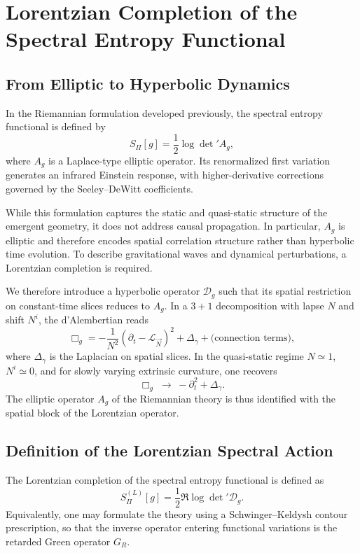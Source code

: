 \section{Lorentzian Completion of the Spectral Entropy Functional}
  \label{sec:lorentzian_completion}

  \subsection{From Elliptic to Hyperbolic Dynamics}
    \label{subsec:from-elliptic-to-hyperbolic-dynamics}

    In the Riemannian formulation developed previously, the spectral entropy
    functional is defined by
    \[
      S_\Pi[g] = \frac12 \log \det{}' A_g,
    \]
    where $A_g$ is a Laplace-type elliptic operator.
    Its renormalized first variation generates an infrared Einstein response,
    with higher-derivative corrections governed by the Seeley--DeWitt
    coefficients.

    While this formulation captures the static and quasi-static structure
    of the emergent geometry, it does not address causal propagation.
    In particular, $A_g$ is elliptic and therefore encodes spatial
    correlation structure rather than hyperbolic time evolution.
    To describe gravitational waves and dynamical perturbations,
    a Lorentzian completion is required.

    We therefore introduce a hyperbolic operator $\mathcal{D}_g$ such that its spatial restriction on constant-time
    slices reduces to $A_g$.
    In a $3+1$ decomposition with lapse $N$ and shift $N^i$, the d'Alembertian reads
    \[
      \Box_g = -\frac{1}{N^2} (\partial_t - \mathcal{L}_{\vec N})^2 + \Delta_\gamma + \text{(connection terms)},
    \]
    where $\Delta_\gamma$ is the Laplacian on spatial slices.
    In the quasi-static regime $N \simeq 1$, $N^i \simeq 0$, and for slowly varying extrinsic curvature, one recovers
    \[
      \Box_g \;\longrightarrow\; -\partial_t^2 + \Delta_\gamma.
    \]
    The elliptic operator $A_g$ of the Riemannian theory is thus identified
    with the spatial block of the Lorentzian operator.

  \subsection{Definition of the Lorentzian Spectral Action}
    \label{subsec:definition-of-the-lorentzian-spectral-action}

    The Lorentzian completion of the spectral entropy functional is defined as
    \[
      S_\Pi^{(L)}[g] = \frac12 \Re \log \det{}' \mathcal{D}_g.
    \]
    Equivalently, one may formulate the theory using a Schwinger--Keldysh contour prescription,
    so that the inverse operator entering functional variations is the retarded Green operator $G_R$.

